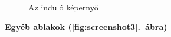 \begin{figure}[htb]
\center
{}
\caption{Az induló képernyő}
\label{fig:screenshot_main}
\end{figure}

\noindent
{\bf Egyéb ablakok (\ref{fig:screenshot3}.~ábra)}


